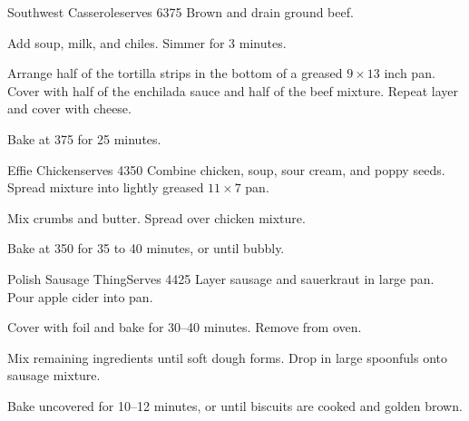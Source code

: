 
\begin{recipe}{Southwest Casserole}{serves 6}{375\0}
    Brown and drain ground beef.

    Add soup, milk, and chiles. Simmer for 3 minutes.

    Arrange half of the tortilla strips in the bottom of a greased $9 \times 13$ inch pan. Cover with half of the enchilada sauce and half of the beef mixture. Repeat layer and cover with cheese.

    \newstep
    Bake at 375\0 for 25 minutes.

\end{recipe}

\begin{recipe}{Effie Chicken}{serves 4}{350\0}
    Combine chicken, soup, sour cream, and poppy seeds. Spread mixture into lightly greased $11\times7$ pan.

    Mix crumbs and butter. Spread over chicken mixture.

    \newstep
    Bake at 350\0 for 35 to 40 minutes, or until bubbly.
\end{recipe}

\begin{recipe}{Polish Sausage Thing}{Serves 4}{425\0}
    Layer sausage and sauerkraut in large pan. Pour apple cider into pan.

    \newstep
    Cover with foil and bake for 30--40 minutes. Remove from oven.

    Mix remaining ingredients until soft dough forms. Drop in large spoonfuls onto sausage mixture.

    \newstep
    Bake uncovered for 10--12 minutes, or until biscuits are cooked and golden brown.
\end{recipe}
